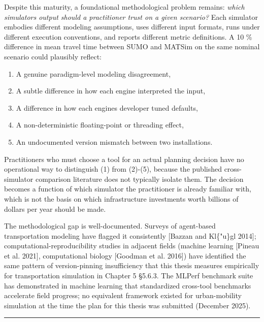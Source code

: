 Despite this maturity, a foundational methodological problem remains:
\emph{which simulator\textquotesingle s output should a practitioner
trust on a given scenario?} Each simulator embodies different modeling
assumptions, uses different input formats, runs under different
execution conventions, and reports different metric definitions. A 10 \%
difference in mean travel time between SUMO and MATSim on the same
nominal scenario could plausibly reflect:

\begin{enumerate}
\def\labelenumi{\arabic{enumi}.}
\tightlist
\item
  A genuine paradigm-level modeling disagreement,
\item
  A subtle difference in how each engine interpreted the input,
\item
  A difference in how each engine\textquotesingle s developer tuned
  defaults,
\item
  A non-deterministic floating-point or threading effect,
\item
  An undocumented version mismatch between two installations.
\end{enumerate}

Practitioners who must choose a tool for an actual planning decision
have no operational way to distinguish (1) from (2)-(5), because the
published cross-simulator comparison literature does not typically
isolate them. The decision becomes a function of which simulator the
practitioner is already familiar with, which is not the basis on which
infrastructure investments worth billions of dollars per year should be
made.

The methodological gap is well-documented. Surveys of agent-based
transportation modeling have flagged it consistently {[}Bazzan and
Kl\{"u\}gl 2014{]}; computational-reproducibility studies in adjacent
fields (machine learning {[}Pineau et al. 2021{]}, computational biology
{[}Goodman et al. 2016{]}) have identified the same pattern of
version-pinning insufficiency that this thesis measures empirically for
transportation simulation in Chapter 5 §5.6.3. The MLPerf benchmark
suite has demonstrated in machine learning that standardized cross-tool
benchmarks accelerate field progress; no equivalent framework existed
for urban-mobility simulation at the time the plan for this thesis
was submitted (December 2025).

\begin{center}\rule{0.5\linewidth}{0.5pt}\end{center}

